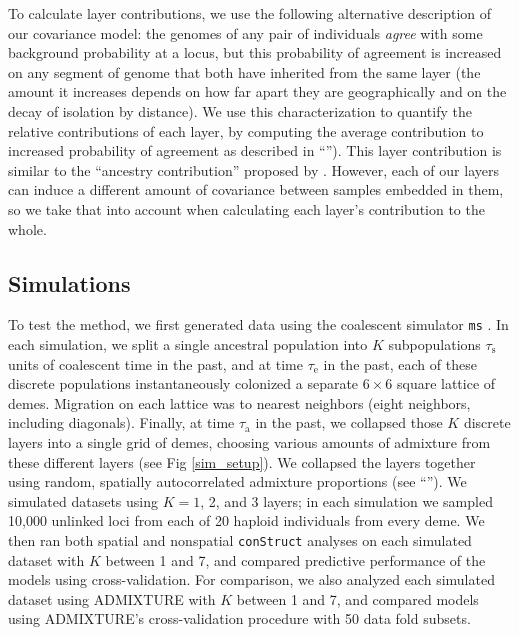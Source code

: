 \documentclass[10pt,letterpaper]{article}
\newcommand{\secref}[1]{``\nameref{#1}''}
\begin{document}
To calculate layer contributions, we use the following alternative description of our covariance model:
the genomes of any pair of individuals \emph{agree} with some
background probability at a locus,
but this probability of agreement is increased on any segment of genome 
that both have inherited from the same layer 
(the amount it increases depends on how far apart they are
geographically and on the decay of isolation by distance).
We use this characterization to quantify the relative contributions of each layer,
by computing the average contribution to increased probability of agreement
as described in \secref{layer_contribution}). 
This layer contribution is similar to the ``ancestry contribution'' proposed by \cite{fastStructure}. 
However, each of our layers can induce a different amount of covariance between samples embedded in them, 
so we take that into account when calculating each layer's contribution to the whole.



\subsection*{Simulations}

To test the method, we first generated data using the coalescent simulator \texttt{ms} \cite{Hudson2002}.
In each simulation,
we split a single ancestral population into $K$ subpopulations $\tau_{\text{s}}$ units of coalescent time in the past,
and at time $\tau_{\text{e}}$ in the past,
each of these discrete populations instantaneously colonized a
separate $6 \times 6$ square lattice of demes.
Migration on each lattice was to nearest neighbors (eight neighbors, including diagonals).
Finally, at time $\tau_{\text{a}}$ in the past, 
we collapsed those $K$ discrete layers into a single grid of demes,
choosing various amounts of admixture from these different layers
(see Fig \ref{sim_setup}). 
We collapsed the layers together using random, spatially autocorrelated admixture proportions 
(see \secref{sim_details}).
We simulated datasets using $K=1$, 2, and 3 layers;
in each simulation we sampled 10,000 unlinked loci from each of 20 haploid individuals from every deme.
We then ran both spatial and nonspatial \texttt{conStruct} analyses on each simulated dataset with $K$ between 1 and 7,
and compared predictive performance of the models using cross-validation.
For comparison,
we also analyzed each simulated dataset using ADMIXTURE \cite{ADMIXTURE} with $K$ between 1 and 7, 
and compared models using ADMIXTURE's cross-validation procedure with 50 data fold subsets.
\end{document}

